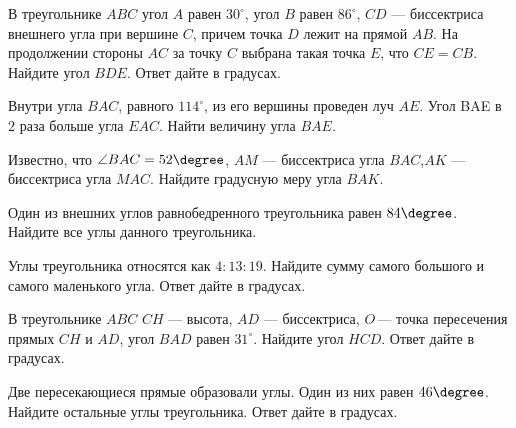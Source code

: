 \begin{class}[number=2]
\begin{listofex}
		\item В треугольнике \( ABC \) угол \( A \) равен \( 30^{\circ} \), угол \( B \) равен \( 86^{\circ} \), \( CD \)  — биссектриса внешнего угла при вершине \( C \), причем точка \( D \) лежит на прямой \( AB \). На продолжении стороны \( AC \) за точку \( C  \) выбрана такая точка \( E \), что \( CE  =  CB \). Найдите угол \( BDE \). Ответ дайте в градусах.
		\item Внутри угла \( BAC \), равного \( 114^{\circ} \), из его вершины проведен луч \( AE \). Угол BAE в \( 2 \) раза больше угла \( EAC \). Найти величину угла \( BAE \). 
	\end{listofex}
\end{class}

\begin{homework}[number=2]
	\begin{listofex}
		\item Известно, что  \( \angle BAC = 52\degree \), \( AM \) — биссектриса угла \( BAC \),\( AK \) — биссектриса угла \(  MAC \). Найдите градусную меру угла \( BAK \).
		\item Один из внешних углов равнобедренного треугольника равен \( 84\degree \). Найдите все углы данного треугольника.
		\item Углы треугольника относятся как \(  4:13:19 \). Найдите сумму самого большого и самого маленького угла. Ответ дайте в градусах.
		\item В треугольнике \( ABC \) \( CH \)  — высота, \( AD \)  —  биссектриса, \( O \) — точка пересечения прямых \( CH \) и \( AD \), угол \( BAD \) равен \( 31^{\circ} \). Найдите угол \( HCD \). Ответ дайте в градусах.
		\item Две пересекающиеся прямые образовали углы. Один из них равен \( 46\degree \). Найдите остальные углы треугольника. Ответ дайте в градусах.
	\end{listofex}
\end{homework}

